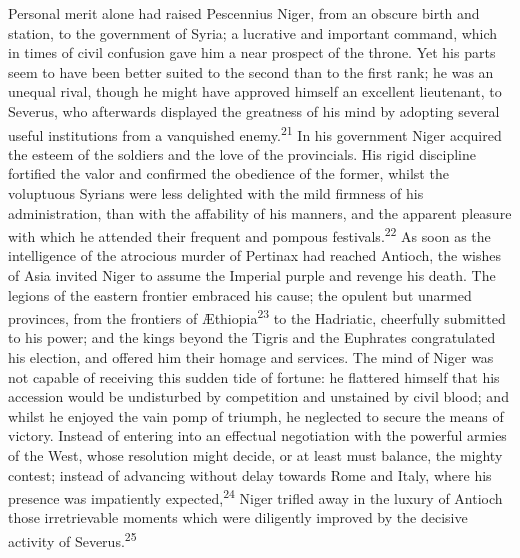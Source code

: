 




Personal merit alone had raised Pescennius Niger, from an obscure
birth and station, to the government of Syria; a lucrative and
important command, which in times of civil confusion gave him a
near prospect of the throne. Yet his parts seem to have been
better suited to the second than to the first rank; he was an
unequal rival, though he might have approved himself an excellent
lieutenant, to Severus, who afterwards displayed the greatness of
his mind by adopting several useful institutions from a
vanquished enemy.\textsuperscript{21} In his government Niger acquired the esteem
of the soldiers and the love of the provincials. His rigid
discipline fortified the valor and confirmed the obedience of the
former, whilst the voluptuous Syrians were less delighted with
the mild firmness of his administration, than with the affability
of his manners, and the apparent pleasure with which he attended
their frequent and pompous festivals.\textsuperscript{22} As soon as the
intelligence of the atrocious murder of Pertinax had reached
Antioch, the wishes of Asia invited Niger to assume the Imperial
purple and revenge his death. The legions of the eastern frontier
embraced his cause; the opulent but unarmed provinces, from the
frontiers of Æthiopia\textsuperscript{23} to the Hadriatic, cheerfully submitted
to his power; and the kings beyond the Tigris and the Euphrates
congratulated his election, and offered him their homage and
services. The mind of Niger was not capable of receiving this
sudden tide of fortune: he flattered himself that his accession
would be undisturbed by competition and unstained by civil blood;
and whilst he enjoyed the vain pomp of triumph, he neglected to
secure the means of victory. Instead of entering into an
effectual negotiation with the powerful armies of the West, whose
resolution might decide, or at least must balance, the mighty
contest; instead of advancing without delay towards Rome and
Italy, where his presence was impatiently expected,\textsuperscript{24} Niger
trifled away in the luxury of Antioch those irretrievable moments
which were diligently improved by the decisive activity of
Severus.\textsuperscript{25}

